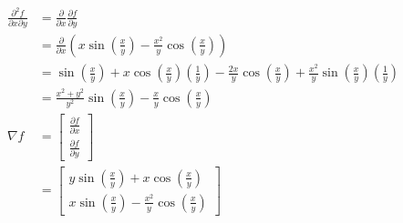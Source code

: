 \begin{enumerate}
\begin{align*}
 \end{align*}
 \begin{align*}
   \frac{\partial^2 f}{\partial x \partial y}
   &= \frac{\partial}{\partial x}\frac{\partial f}{\partial y} \\
   &= \frac{\partial}{\partial x}(x\sin(\frac{x}{y}) - \frac{x^2}{y}\cos(\frac{x}{y})) \\
   &= \sin(\frac{x}{y}) + x\cos(\frac{x}{y})(\frac{1}{y}) - \frac{2x}{y}\cos(\frac{x}{y}) + \frac{x^2}{y}\sin(\frac{x}{y})(\frac{1}{y}) \\
   &= \frac{x^2+y^2}{y^2}\sin(\frac{x}{y}) - \frac{x}{y}\cos(\frac{x}{y}) \\
   \nabla f
   &= \begin{bmatrix}
       \frac{\partial f}{\partial x} \\
       \frac{\partial f}{\partial y}
      \end{bmatrix} \\
   &= \begin{bmatrix}
       y\sin(\frac{x}{y}) + x\cos(\frac{x}{y}) \\
       x\sin(\frac{x}{y}) - \frac{x^2}{y}\cos(\frac{x}{y})
      \end{bmatrix}
  \end{align*}


\end{enumerate}
